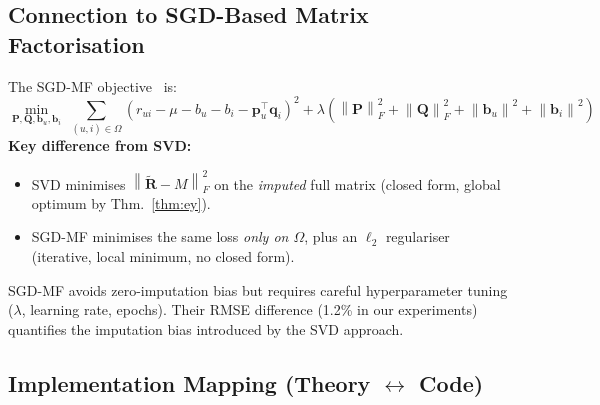 \documentclass[12pt, a4paper]{article}
\newcommand{\Rmat}{\mathbf{R}}
\newcommand{\Pmat}{\mathbf{P}}
\newcommand{\Qmat}{\mathbf{Q}}
\newcommand{\norm}[1]{\left\| #1 \right\|}
\newcommand{\FroSq}[1]{\norm{#1}_{F}^{2}}
\newcommand{\Om}{\Omega}
\begin{document}
\subsection{Connection to SGD-Based Matrix Factorisation}

The SGD-MF objective~\citep{funk2006} is:
\begin{equation}
  \min_{\Pmat, \Qmat, \mathbf{b}_u, \mathbf{b}_i}\;
  \sum_{(u,i)\in\Om} \!\!\left(r_{ui} - \mu - b_u - b_i - \mathbf{p}_u^\top \mathbf{q}_i\right)^2
  + \lambda\!\left(\FroSq{\Pmat} + \FroSq{\Qmat}
    + \norm{\mathbf{b}_u}^2 + \norm{\mathbf{b}_i}^2\right)
  \label{eq:sgd}
\end{equation}
\textbf{Key difference from SVD:}
\begin{itemize}[leftmargin=1.5em]
  \item SVD minimises $\FroSq{\tilde{\Rmat}-M}$ on the \emph{imputed}
        full matrix (closed form, global optimum by Thm.~\ref{thm:ey}).
  \item SGD-MF minimises the same loss \emph{only on $\Om$}, plus an
        $\ell_2$ regulariser (iterative, local minimum, no closed form).
\end{itemize}
SGD-MF avoids zero-imputation bias but requires careful hyperparameter
tuning ($\lambda$, learning rate, epochs).
Their RMSE difference (1.2\% in our experiments) quantifies the
imputation bias introduced by the SVD approach.

\subsection{Implementation Mapping (Theory $\leftrightarrow$ Code)}
\label{sec:impl_map}
\end{document}
